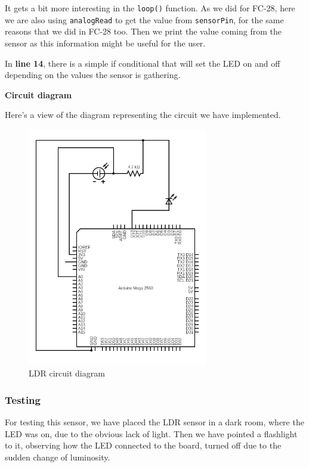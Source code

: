 \vspace{5mm}
It gets a bit more interesting in the \verb|loop()| function. As we did for FC-28, here we are also using \verb|analogRead| to get the value from \verb|sensorPin|, for the same reasons that we did in FC-28 too. Then we print the value coming from the sensor as this information might be useful for the user.

\vspace{5mm}
In \textbf{line 14}, there is a simple if conditional that will set the LED on and off depending on the values the sensor is gathering.

\vspace{7mm}
\textbf{Circuit diagram}

Here's a view of the diagram representing the circuit we have implemented.

\begin{figure}[H]
    \centering
    \includegraphics[width=0.7\textwidth]{fig/ldr-scheme-circuit.png}
    \caption{LDR circuit diagram}
    \label{fig:ldr}
\end{figure}

\vspace{7mm}
\subsubsection{Testing}
For testing this sensor, we have placed the LDR sensor in a dark room, where the LED was on, due to the obvious lack of light. Then we have pointed a flashlight to it, observing how the LED connected to the board, turned off due to the sudden change of luminosity.


